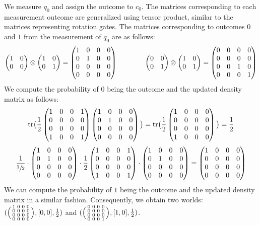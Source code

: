 We measure $q_0$ and assign the outcome to $c_0$.
%
The matrices corresponding to each measurement outcome are generalized using
tensor product, similar to the matrices representing rotation gates.
%
The matrices corresponding to outcomes $0$ and $1$ from the measurement of
$q_0$ are as follows:
%
\[
	\begin{pmatrix}1&0\\0&0\end{pmatrix}\otimes\begin{pmatrix}1&0\\0&1\end{pmatrix}
	=\begin{pmatrix}1&0&0&0\\0&1&0&0\\0&0&0&0\\0&0&0&0\end{pmatrix}
	\qquad\qquad
	\begin{pmatrix}0&0\\0&1\end{pmatrix}\otimes\begin{pmatrix}1&0\\0&1\end{pmatrix}
	=\begin{pmatrix}0&0&0&0\\0&0&0&0\\0&0&1&0\\0&0&0&1\end{pmatrix}
\]
%
We compute the probability of $0$ being the outcome and the updated density
matrix as follows:
%
\[
	\textrm{tr}\big(\frac{1}{2}\begin{pmatrix}1&0&0&1\\0&0&0&0\\0&0&0&0\\1&0&0&1\end{pmatrix}\begin{pmatrix}1&0&0&0\\0&1&0&0\\0&0&0&0\\0&0&0&0\end{pmatrix}\big)
	=\textrm{tr}\big(\frac{1}{2}\begin{pmatrix}1&0&0&0\\0&0&0&0\\0&0&0&0\\1&0&0&0\end{pmatrix}\big)
	=\frac{1}{2}
\]
\[
	\frac{1}{\sfrac{1}{2}}
	\cdot\begin{pmatrix}1&0&0&0\\0&1&0&0\\0&0&0&0\\0&0&0&0\end{pmatrix}
	\cdot\frac{1}{2}\begin{pmatrix}1&0&0&1\\0&0&0&0\\0&0&0&0\\1&0&0&1\end{pmatrix}
	\cdot\begin{pmatrix}1&0&0&0\\0&1&0&0\\0&0&0&0\\0&0&0&0\end{pmatrix}
	=\begin{pmatrix}1&0&0&0\\0&0&0&0\\0&0&0&0\\0&0&0&0\end{pmatrix}
\]
%
We can compute the probability of $1$ being the outcome and the updated density
matrix in a similar fashion.
%
Consequently, we obtain two worlds:
$(\Big(\begin{smallmatrix}1&0&0&0\\0&0&0&0\\0&0&0&0\\0&0&0&0\end{smallmatrix}\Big),[0,0],\frac{1}{2})$ and
$(\Big(\begin{smallmatrix}0&0&0&0\\0&0&0&0\\0&0&0&0\\0&0&0&1\end{smallmatrix}\Big),[1,0],\frac{1}{2})$.

